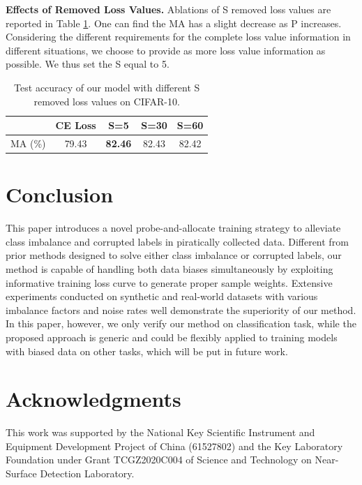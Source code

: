 \documentclass[letterpaper]{article} %
\newcommand{\bd}[1]{\textbf{#1}}
\begin{document}
\noindent\bd{Effects of Removed Loss Values.} Ablations of S removed loss values are reported in Table \ref{tab:cifar10_s}.
One can find the MA has a slight decrease as P increases.
Considering the different requirements for the complete loss value information in different situations, we choose to provide as more loss value information as possible.
We thus set the S equal to 5.
\begin{table}[h]
\vspace{-0.1cm}
\begin{center}
\tabcolsep=0.37cm
\begin{tabular}{c|c|c|c|c}
\hline
 & CE Loss &  S=5  &  S=30 &  S=60 \\
 \hline
 MA (\%)  & 79.43 & \textbf{82.46 } & 82.43 & 82.42\\
\hline
\end{tabular}%
\vspace{-0.30cm} 
\caption{Test accuracy of our model with different S removed loss values on CIFAR-10.} %
\label{tab:cifar10_s}
\vspace{-0.5cm}
\end{center}
\end{table}


\section{Conclusion}\label{sec:conclusion}

This paper introduces a novel probe-and-allocate training strategy to alleviate class imbalance and corrupted labels in piratically collected data.
Different from prior methods designed to solve either class imbalance or corrupted labels, our method is capable of handling both data biases simultaneously by exploiting informative training loss curve to generate proper sample weights. 
Extensive experiments conducted on synthetic and real-world datasets with various imbalance factors and noise rates well demonstrate the superiority of our method. 
In this paper, however, we only verify our method on classification task, while the proposed approach is generic and could be flexibly applied to training models with biased data on other tasks, which  will be put in future work. 

\section{Acknowledgments}
This work was supported by the National Key Scientific Instrument and Equipment Development Project of China (61527802) and  the Key Laboratory Foundation under Grant TCGZ2020C004 of Science and Technology on Near-Surface Detection Laboratory.



\end{document}
